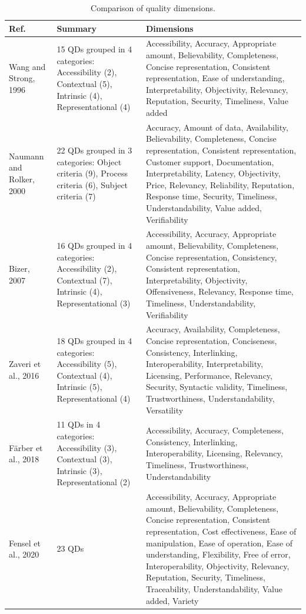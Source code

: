 \documentclass[runningheads]{llncs}
\begin{document}
%
\begin{table}
\caption{Comparison of quality dimensions.}
\label{tab:quality-dimensions}
\scriptsize
\centering
\begin{tabular}{|p{1.3cm}|p{3cm}|p{7.5cm}|}
\hline
Ref. & Summary & Dimensions \\ 
\hline
Wang and Strong, 1996~\cite{WangS96} & 15 QDs grouped in 4 categories: Accessibility (2), Contextual (5), Intrinsic (4), Representational (4) & Accessibility, Accuracy, Appropriate amount, Believability, Completeness, Concise representation, Consistent representation, Ease of understanding, Interpretability, Objectivity, Relevancy, Reputation, Security, Timeliness, Value added \\ 
\hline
Naumann and Rolker, 2000~\cite{NaumannR00} & 22 QDs grouped in 3 categories: Object criteria (9), Process criteria (6), Subject criteria (7) & Accuracy, Amount of data, Availability, Believability, Completeness, Concise representation, Consistent representation, Customer support, Documentation, Interpretability, Latency, Objectivity, Price, Relevancy, Reliability, Reputation, Response time, Security, Timeliness, Understandability, Value added, Verifiability \\ 
\hline
Bizer, 2007~\cite{bizer2007} & 16 QDs grouped in 4 categories: Accessibility (2), Contextual (7), Intrinsic (4), Representational (3) & Accessibility, Accuracy, Appropriate amount, Believability, Completeness, Concise representation, Consistency, Consistent representation, Interpretability, Objectivity, Offensiveness, Relevancy, Response time, Timeliness, Understandability, Verifiability \\ 
\hline
Zaveri et al., 2016~\cite{ZaveriRMPLA16} & 18 QDs grouped in 4 categories: Accessibility (5), Contextual (4), Intrinsic (5), Representational (4) & Accuracy, Availability, Completeness, Concise representation, Conciseness, Consistency, Interlinking, Interoperability, Interpretability, Licensing, Performance, Relevancy, Security, Syntactic validity, Timeliness, Trustworthiness, Understandability, Versatility \\ 
\hline
F\"{a}rber et al., 2018~\cite{FarberBMR18} & 11 QDs in 4 categories: Accessibility (3), Contextual (3), Intrinsic (3), Representational (2) & Accessibility, Accuracy, Completeness, Consistency, Interlinking, Interoperability, Licensing, Relevancy, Timeliness, Trustworthiness, Understandability \\ 
\hline
Fensel et al., 2020~\cite{FenselSAHKPTUW20} & 23 QDs & Accessibility, Accuracy, Appropriate amount, Believability, Completeness, Concise representation, Consistent representation, Cost effectiveness, Ease of manipulation, Ease of operation, Ease of understanding, Flexibility, Free of error, Interoperability, Objectivity, Relevancy, Reputation, Security, Timeliness, Traceability, Understandability, Value added, Variety \\

\end{tabular}
\end{table}
\end{document}
